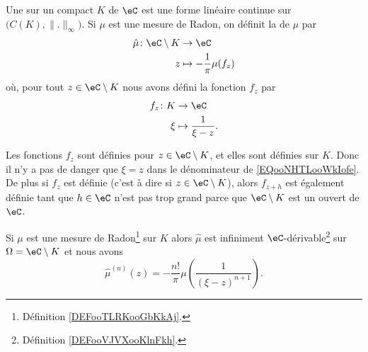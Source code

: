 \begin{definition}      \label{DEFooTLRKooGbKkAj}
	Une  sur un compact \(  K\) de \( \eC\) est une forme linéaire continue sur \( \big( C(K),\| . \|_{\infty} \big)\). Si \( \mu\) est une mesure de Radon, on définit la  de \( \mu\) par
	\begin{equation}
		\begin{aligned}
			\hat \mu\colon \eC\setminus K & \to \eC                          \\
			z                             & \mapsto -\frac{1}{ \pi }\mu(f_z)
		\end{aligned}
	\end{equation}
	où, pour tout \( z\in \eC\setminus K\) nous avons défini la fonction \( f_z\) par
	\begin{equation}        \label{EQooNHTLooWkIofe}
		\begin{aligned}
			f_z\colon K & \to \eC                    \\
			\xi         & \mapsto \frac{1}{ \xi-z }.
		\end{aligned}
	\end{equation}
\end{definition}

\begin{normaltext}
	Les fonctions \( f_z\) sont définies pour \( z\in \eC\setminus K\), et elles sont définies sur \( K\). Donc il n'y a pas de danger que \( \xi=z\) dans le dénominateur de \eqref{EQooNHTLooWkIofe}. De plus si \( f_z\) est définie (c'est à dire si \( z\in \eC\setminus K\)), alors \( f_{z+h}\) est également définie tant que \( h\in \eC\) n'est pas trop grand parce que \( \eC\setminus K\) est un ouvert de \( \eC\).
\end{normaltext}

\begin{theorem}     \label{ThoJVNTzn}
	Si \( \mu\) est une mesure de Radon\footnote{Définition \ref{DEFooTLRKooGbKkAj}.} sur \( K\) alors \( \hat \mu\) est infiniment \( \eC\)-dérivable\footnote{Définition \ref{DEFooVJVXooKlnFkh}.} sur \( \Omega=\eC\setminus K\) et nous avons
	\begin{equation}
		\hat\mu^{(n)}(z)=-\frac{ n! }{ \pi }\mu\left( \frac{1}{ (\xi-z)^{n+1} } \right).
	\end{equation}
\end{theorem}

